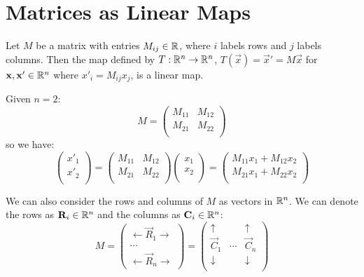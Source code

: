 \documentclass[../main.tex]{subfiles}
\begin{document}
\section{Matrices as Linear Maps}
\label{matricesAsLinearMaps}
Let $M$ be a matrix with entries $M_{i j} \in \mathbb{R}$, where $i$ labels rows and $j$ labels columns.
Then the map defined by $T: \mathbb{R}^{n} \to \mathbb{R}^{n}$, $T(\vec{x}) = \vec{x}' = M\vec{x}$ for $\mathbf{\bm{x}}, \mathbf{\bm{x}}' \in \mathbb{R}^{n}$ where $x'_i = M_{i j}x_j$, is a linear map.
\begin{example}
  Given $n = 2$:
  \[
    M = \begin{pmatrix}
    M_{1 1} & M_{1 2} \\
    M_{2 1} & M_{2 2} \\
    \end{pmatrix}
  \]
  so we have:
  \[
    \begin{pmatrix}
    x'_1 \\
    x'_2 \\
    \end{pmatrix}
    =
    \begin{pmatrix}
    M_{1 1} & M_{1 2} \\
    M_{2 1} & M_{2 2} \\
    \end{pmatrix}
    \begin{pmatrix}
    x_1 \\
    x_2 \\
    \end{pmatrix}
    =
    \begin{pmatrix}
    M_{1 1}x_1 + M_{1 2}x_2 \\
    M_{2 1}x_1 + M_{2 2}x_2 \\
    \end{pmatrix}
  \]
\end{example}
We can also consider the rows and columns of $M$ as vectors in $\mathbb{R}^{n}$.
We can denote the rows as $\mathbf{\bm{R}}_i \in \mathbb{R}^{n}$ and the columns as $\mathbf{\bm{C}}_i \in \mathbb{R}^{n}$:
\[
  M = \begin{pmatrix}
  \leftarrow \vec{R}_1 \rightarrow \\
  \cdots \\
  \leftarrow \vec{R}_n \rightarrow
  \end{pmatrix}
  =
  \begin{pmatrix}
  \uparrow & & \uparrow  \\
  \vec{C}_1 & \cdots & \vec{C}_n  \\
  \downarrow &  & \downarrow \\
  \end{pmatrix}
\]
\end{document}
